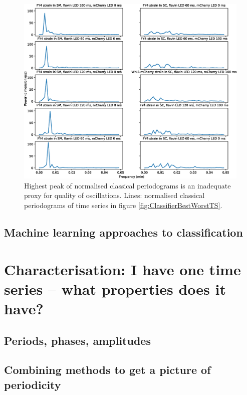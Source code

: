 \begin{figure}[htbp]
  \centering
  \includegraphics[width=\textwidth]{10m_ClassifierBestWorstPS}
  \caption{Highest peak of normalised classical periodograms is an inadequate proxy for quality of oscillations.
    Lines: normalised classical periodograms of time series in figure \ref{fig:ClassifierBestWorstTS}.}
  \label{fig:ClassifierBestWorstPS}
\end{figure}


\subsection{Machine learning approaches to classification}
\label{subsec:analysis-classification-ml}


\section{Characterisation: I have one time series -- what properties does it have?}
\label{sec:analysis-characterisation}

\subsection{Periods, phases, amplitudes}
\label{subsec:analysis-characterisation-quantities}

\subsection{Combining methods to get a picture of periodicity}
\label{subsec:analysis-characterisation-combined}


